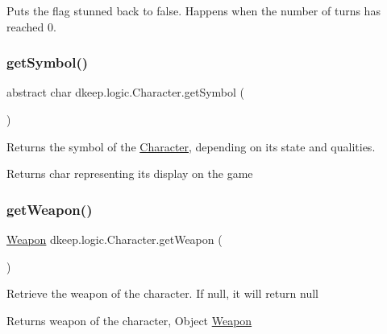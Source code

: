 Puts the flag stunned back to false. Happens when the number of turns has reached 0. \mbox{\label{classdkeep_1_1logic_1_1_character_a8cb0733b49fdd569cc58fe5a3b1a9c29}} 
\subsubsection{\texorpdfstring{get\+Symbol()}{getSymbol()}}
{\footnotesize\ttfamily abstract char dkeep.\+logic.\+Character.\+get\+Symbol (\begin{DoxyParamCaption}{ }\end{DoxyParamCaption})\hspace{0.3cm}{\ttfamily [abstract]}}

Returns the symbol of the \hyperlink{classdkeep_1_1logic_1_1_character}{Character}, depending on it\textquotesingle{}s state and qualities. \begin{DoxyReturn}{Returns}
char representing it\textquotesingle{}s display on the game 
\end{DoxyReturn}
\mbox{\label{classdkeep_1_1logic_1_1_character_a19d825a86884f725aedd76fdd49ff964}} 
\subsubsection{\texorpdfstring{get\+Weapon()}{getWeapon()}}
{\footnotesize\ttfamily \hyperlink{classdkeep_1_1logic_1_1_weapon}{Weapon} dkeep.\+logic.\+Character.\+get\+Weapon (\begin{DoxyParamCaption}{ }\end{DoxyParamCaption})}

Retrieve the weapon of the character. If null, it will return null \begin{DoxyReturn}{Returns}
weapon of the character, Object \hyperlink{classdkeep_1_1logic_1_1_weapon}{Weapon} 
\end{DoxyReturn}
\mbox{\label{classdkeep_1_1logic_1_1_character_a22be2db9df156acfb3638b3d8826f5ea}} 
